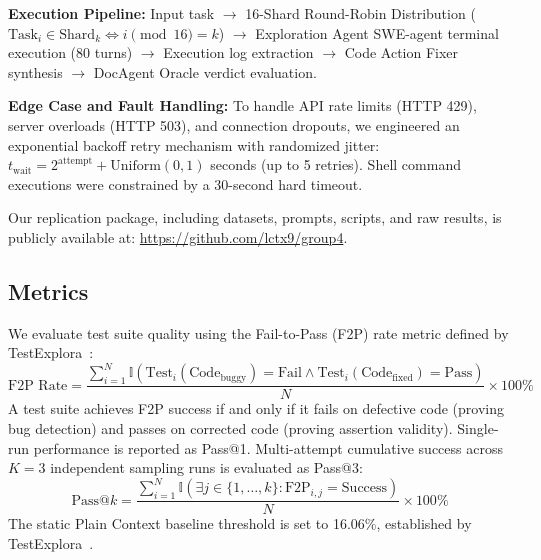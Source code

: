 \documentclass[conference]{IEEEtran}
\begin{document}
\textbf{Execution Pipeline:} Input task $\rightarrow$ 16-Shard Round-Robin Distribution ($\text{Task}_i \in \text{Shard}_k \iff i \pmod{16} = k$) $\rightarrow$ Exploration Agent SWE-agent terminal execution (80 turns) $\rightarrow$ Execution log extraction $\rightarrow$ Code Action Fixer synthesis $\rightarrow$ DocAgent Oracle verdict evaluation.

\textbf{Edge Case and Fault Handling:} To handle API rate limits (HTTP 429), server overloads (HTTP 503), and connection dropouts, we engineered an exponential backoff retry mechanism with randomized jitter: $t_{\text{wait}} = 2^{\text{attempt}} + \text{Uniform}(0, 1)$ seconds (up to 5 retries). Shell command executions were constrained by a 30-second hard timeout.

Our replication package, including datasets, prompts, scripts, and raw results, is publicly available at: \url{https://github.com/lctx9/group4}.

\subsection{Metrics}
\label{subsec:metrics}
We evaluate test suite quality using the Fail-to-Pass (F2P) rate metric defined by TestExplora~\cite{testexplora}:
\begin{equation}
\text{F2P Rate} = \frac{\sum_{i=1}^{N} \mathbb{I}(\text{Test}_i(\text{Code}_{\text{buggy}}) = \text{Fail} \land \text{Test}_i(\text{Code}_{\text{fixed}}) = \text{Pass})}{N} \times 100\%
\end{equation}
A test suite achieves F2P success if and only if it fails on defective code (proving bug detection) and passes on corrected code (proving assertion validity). Single-run performance is reported as Pass@1. Multi-attempt cumulative success across $K=3$ independent sampling runs is evaluated as Pass@3:
\begin{equation}
\text{Pass@}k = \frac{\sum_{i=1}^{N} \mathbb{I}\left( \exists j \in \{1,\dots,k\}: \text{F2P}_{i,j} = \text{Success} \right)}{N} \times 100\%
\end{equation}
The static Plain Context baseline threshold is set to 16.06\%, established by TestExplora~\cite{testexplora}.
\end{document}
